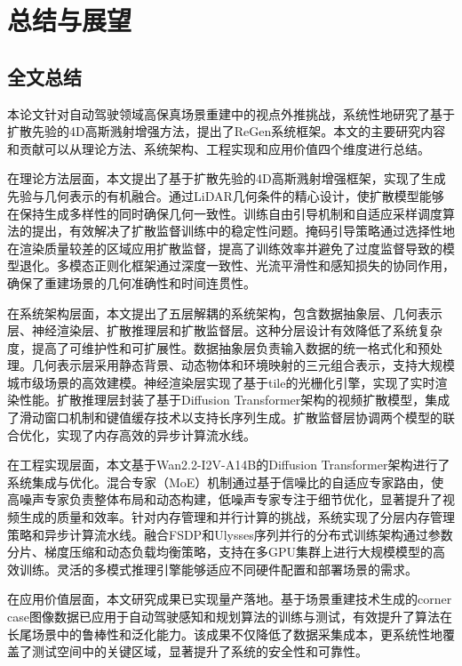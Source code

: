
\chapter{总结与展望}

\section{全文总结}

本论文针对自动驾驶领域高保真场景重建中的视点外推挑战，系统性地研究了基于扩散先验的4D高斯溅射增强方法，提出了ReGen系统框架。本文的主要研究内容和贡献可以从理论方法、系统架构、工程实现和应用价值四个维度进行总结。

在理论方法层面，本文提出了基于扩散先验的4D高斯溅射增强框架，实现了生成先验与几何表示的有机融合。通过LiDAR几何条件的精心设计，使扩散模型能够在保持生成多样性的同时确保几何一致性。训练自由引导机制和自适应采样调度算法的提出，有效解决了扩散监督训练中的稳定性问题。掩码引导策略通过选择性地在渲染质量较差的区域应用扩散监督，提高了训练效率并避免了过度监督导致的模型退化。多模态正则化框架通过深度一致性、光流平滑性和感知损失的协同作用，确保了重建场景的几何准确性和时间连贯性。

在系统架构层面，本文提出了五层解耦的系统架构，包含数据抽象层、几何表示层、神经渲染层、扩散推理层和扩散监督层。这种分层设计有效降低了系统复杂度，提高了可维护性和可扩展性。数据抽象层负责输入数据的统一格式化和预处理。几何表示层采用静态背景、动态物体和环境映射的三元组合表示，支持大规模城市级场景的高效建模。神经渲染层实现了基于tile的光栅化引擎，实现了实时渲染性能。扩散推理层封装了基于Diffusion Transformer架构的视频扩散模型，集成了滑动窗口机制和键值缓存技术以支持长序列生成。扩散监督层协调两个模型的联合优化，实现了内存高效的异步计算流水线。

在工程实现层面，本文基于Wan2.2-I2V-A14B的Diffusion Transformer架构进行了系统集成与优化。混合专家（MoE）机制通过基于信噪比的自适应专家路由，使高噪声专家负责整体布局和动态构建，低噪声专家专注于细节优化，显著提升了视频生成的质量和效率。针对内存管理和并行计算的挑战，系统实现了分层内存管理策略和异步计算流水线。融合FSDP和Ulysses序列并行的分布式训练架构通过参数分片、梯度压缩和动态负载均衡策略，支持在多GPU集群上进行大规模模型的高效训练。灵活的多模式推理引擎能够适应不同硬件配置和部署场景的需求。

在应用价值层面，本文研究成果已实现量产落地。基于场景重建技术生成的corner case图像数据已应用于自动驾驶感知和规划算法的训练与测试，有效提升了算法在长尾场景中的鲁棒性和泛化能力。该成果不仅降低了数据采集成本，更系统性地覆盖了测试空间中的关键区域，显著提升了系统的安全性和可靠性。

